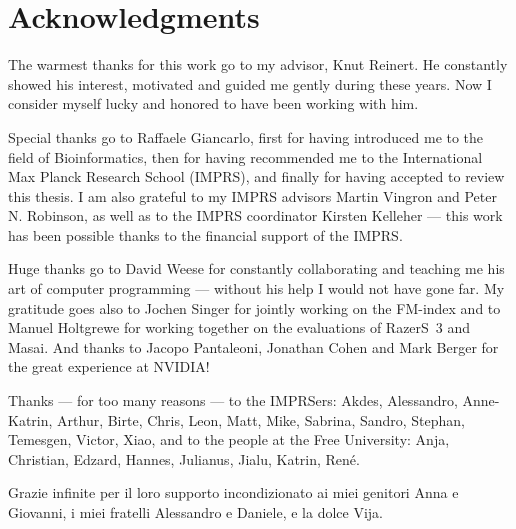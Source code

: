\section*{Acknowledgments}
\label{sec::acknowlegments}

The warmest thanks for this work go to my advisor, Knut Reinert.
He constantly showed his interest, motivated and guided me gently during these years.
Now I consider myself lucky and honored to have been working with him.

Special thanks go to Raffaele Giancarlo, first for having introduced me to the field of Bioinformatics, then for having recommended me to the International Max Planck Research School (IMPRS), and finally for having accepted to review this thesis.
I am also grateful to my IMPRS advisors Martin Vingron and Peter N. Robinson, as well as to the IMPRS coordinator Kirsten Kelleher ---
this work has been possible thanks to the financial support of the IMPRS.

Huge thanks go to David Weese for constantly collaborating and teaching me his art of computer programming --- without his help I would not have gone far.
My gratitude goes also to Jochen Singer for jointly working on the FM-index and to Manuel Holtgrewe for working together on the evaluations of RazerS~3 and Masai.
And thanks to Jacopo Pantaleoni, Jonathan Cohen and Mark Berger for the great experience at NVIDIA!

Thanks --- for too many reasons --- to the IMPRSers: Akdes, Alessandro, Anne-Katrin, Arthur, Birte, Chris, Leon, Matt, Mike, Sabrina, Sandro, Stephan, Temesgen, Victor, Xiao, 
and to the people at the Free University: Anja, Christian, Edzard, Hannes, Julianus, Jialu, Katrin, Ren\'e.

Grazie infinite per il loro supporto incondizionato ai miei genitori Anna e Giovanni, i miei fratelli Alessandro e Daniele, e la dolce Vija.
